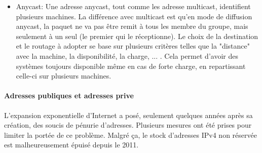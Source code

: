\begin{itemize}
 Le protocole IGMP va entrer en jeu pour faire cet échange.
Cette indication a été rendu obligatoire dans le but de ne pas faire circuler tous les paquets a destination de groupes multicast.
 Il n'est en effet pas nécessaire de relayer tous les paquets de tous les groupes
multicast sur le réseau, si celui-ci ne contient aucun abonné au groupe.
Le faite d'avertir le routeur qu'il y a des machines abonnées à un groupe dans le réseau permet aussi à celui-ci
d'établir un lien avec l'émetteur. Mais ceci fait partie du routage des paquets par le routeur.
Il existe une plage d'adresse qui est réservée pour les adresses IP multicast. Lorsqu'on veut contacter
plusieurs machines, une adresse dans cette plage peut être utilisée.
Elle s'étend de l'adresse 224.0.0.0 à l'adresse 239.255.255.255 et a pour masque 240.0.0.0 . Cela laisse donc 2\^28 adresses
multicast différentes.
Au sein de cette plage d'adresse il existe une catégorisation:
//TODO
\begin{itemize}
\item
\end{itemize}
Ce mode permet de limiter le nombre de paquets envoyés pour joindre plusieurs machines et il est très utilisé dans le cas
de diffusions en streaming ou de vidéoconférences, où il faut faire parvenir une même information à plusieurs participants.

\item Anycast: Une adresse anycast, tout comme les adresse multicast, identifient plusieurs machines. La différence avec multicast
est qu'en mode de diffusion anycast, la paquet ne va pas être remit à tous les membre du groupe, mais seulement à un seul (le premier qui le réceptionne).
Le choix de la destination et le routage à adopter se base sur plusieurs critères telles que la "distance" avec la machine, la disponibilité,
la charge, ... . Cela permet d'avoir des systèmes toujours disponible même en cas de forte charge, en repartissant celle-ci sur
plusieurs machines.
\end{itemize}



\paragraph{Adresses publiques et adresses prive}
L'expansion exponentielle d'Internet a posé, seulement quelques années après sa création, des
soucis de pénurie d'adresses. Plusieurs mesures ont été prises pour limiter la
portée de ce problème. Malgré ça, le stock d'adresses IPv4 non réservée
est malheureusement épuisé depuis le 2011.


